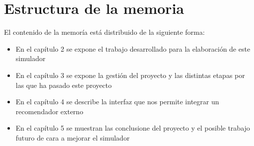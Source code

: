 \section{Estructura de la memoria}
\thispagestyle{empty}

El contenido de la memoría está distribuido de la siguiente forma:

\begin{itemize}
	\item En el capítulo 2 se expone el trabajo desarrollado para la elaboración de este simulador
	\item En el capítulo 3 se expone la gestión del proyecto y las distintas etapas por las que ha pasado este proyecto
       \item En el capítulo 4 se describe la interfaz que nos permite integrar un recomendador externo
	\item En el capítulo 5 se muestran las conclusione del proyecto y el posible trabajo futuro de cara a mejorar el simulador 
\end{itemize}